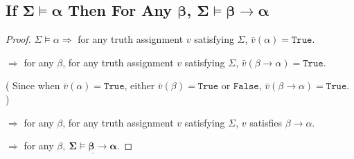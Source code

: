 \documentclass{article}
\begin{document}
\subsection{If $\boldsymbol{\Sigma\vDash\alpha}$ Then For Any $\boldsymbol{\beta}$, $\boldsymbol{\Sigma\vDash\beta\to\alpha}$}
\vspace{1em}
\begin{proof}
    $\Sigma\vDash\alpha\Longrightarrow$ for any truth assignment $v$ satisfying $\Sigma$, $\bar{v}(\alpha)=\mathtt{True}$.

    \hspace{4em}
    $\Longrightarrow$ for any $\beta$, for any truth assignment $v$ satisfying $\Sigma$, $\bar{v}(\beta\to\alpha)=\mathtt{True}$. 
    
    \hspace{6em}
    ( Since when $\bar{v}(\alpha)=\mathtt{True}$, either $\bar{v}(\beta)=\mathtt{True}$ or $\mathtt{False}$, $\bar{v}(\beta\to\alpha)=\mathtt{True}$. )

    \hspace{4em}
    $\Longrightarrow$ for any $\beta$, for any truth assignment $v$ satisfying $\Sigma$, $v$ satisfies $\beta\to\alpha$. 

    \hspace{4em}
    $\Longrightarrow$ for any $\beta,\ \underline{\boldsymbol{\Sigma\vDash\beta\to\alpha}}$. 
\end{proof}

\vspace{1em}
\end{document}
